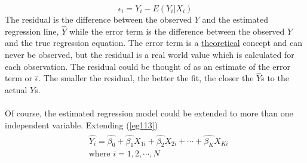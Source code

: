 \documentclass[11pt]{article}
\begin{document}
\begin{equation}
\epsilon_i = Y_i - E(Y_i|X_i) \label{eg1_18}
\end{equation}
The residual is the difference between the observed $Y$ and the estimated regression line, $\hat{Y}$ while the error term is the difference between the observed $Y$ and the true regression equation. The error term is a \underline{theoretical} concept and can never be observed, but the residual is a real world value which is calculated for each observation. The residual could be thought of as an estimate of the error term or $\hat{\epsilon}$. The smaller the residual, the better the fit, the closer the $\hat{Y}$s to the actual $Y$s.\\\\
Of course, the estimated regression model could be extended to more than one independent variable. Extending (\ref{eg113})
\begin{align} \label{eg1_19}
\begin{split}
&\hat{Y_i}= \hat{\beta_0} + \hat{\beta_1} X_{1i} + \hat{\beta_2} X_{2i} + \cdots + \hat{\beta_K} X_{Ki}\\ &\text{where } i=1, 2, \cdots, N 
\end{split}
\end{align}
\end{document}
